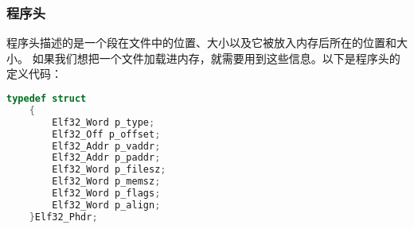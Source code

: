 \documentclass[a4paper,left=2.5cm,right=2.5cm,11pt]{article}
\begin{document}
\subsubsection{程序头}
	程序头描述的是一个段在文件中的位置、大小以及它被放入内存后所在的位置和大小。
	如果我们想把一个文件加载进内存，就需要用到这些信息。以下是程序头的定义代码：
	\begin{lstlisting}[language = C]
	typedef struct
	{
		Elf32_Word p_type;
		Elf32_Off p_offset;
		Elf32_Addr p_vaddr;
		Elf32_Addr p_paddr;
		Elf32_Word p_filesz;
		Elf32_Word p_memsz;
		Elf32_Word p_flags;
		Elf32_Word p_align;
	}Elf32_Phdr;
	\end{lstlisting}
\end{document}
